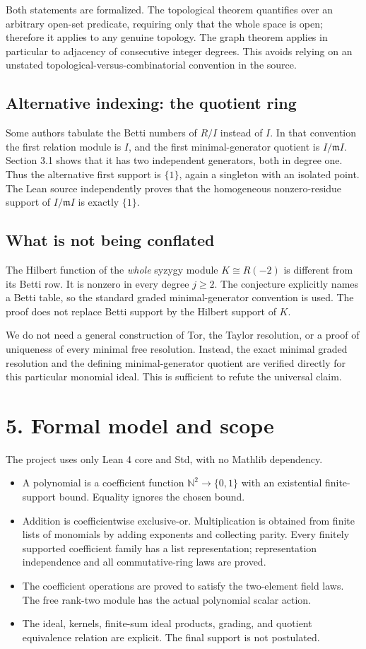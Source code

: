 \documentclass[11pt]{article}
\newcommand{\m}{\mathfrak m}
\begin{document}
Both statements are formalized. The topological theorem quantifies over an
arbitrary open-set predicate, requiring only that the whole space is open;
therefore it applies to any genuine topology. The graph theorem applies in
particular to adjacency of consecutive integer degrees. This avoids relying
on an unstated topological-versus-combinatorial convention in the source.

\subsection*{Alternative indexing: the quotient ring}
Some authors tabulate the Betti numbers of $R/I$ instead of $I$. In that
convention the first relation module is $I$, and the first minimal-generator
quotient is $I/\m I$. Section 3.1 shows that it has two independent generators,
both in degree one. Thus the alternative first support is $\{1\}$, again a
singleton with an isolated point. The Lean source independently proves that
the homogeneous nonzero-residue support of $I/\m I$ is exactly $\{1\}$.

\subsection*{What is not being conflated}
The Hilbert function of the \emph{whole} syzygy module $K\cong R(-2)$ is
different from its Betti row. It is nonzero in every degree $j\ge2$.
The conjecture explicitly names a Betti table, so the standard graded
minimal-generator convention is used. The proof does not replace Betti
support by the Hilbert support of $K$.

We do not need a general construction of Tor, the Taylor resolution, or a
proof of uniqueness of every minimal free resolution. Instead, the exact
minimal graded resolution and the defining minimal-generator quotient are
verified directly for this particular monomial ideal. This is sufficient to
refute the universal claim.

\section*{5. Formal model and scope}
The project uses only Lean 4 core and Std, with no Mathlib dependency.
\begin{itemize}
\item A polynomial is a coefficient function $\mathbb N^2\to\{0,1\}$ with an
existential finite-support bound. Equality ignores the chosen bound.
\item Addition is coefficientwise exclusive-or. Multiplication is obtained
from finite lists of monomials by adding exponents and collecting parity.
Every finitely supported coefficient family has a list representation;
representation independence and all commutative-ring laws are proved.
\item The coefficient operations are proved to satisfy the two-element field
laws. The free rank-two module has the actual polynomial scalar action.
\item The ideal, kernels, finite-sum ideal products, grading, and quotient
equivalence relation are explicit. The final support is not postulated.
\end{itemize}
\end{document}
